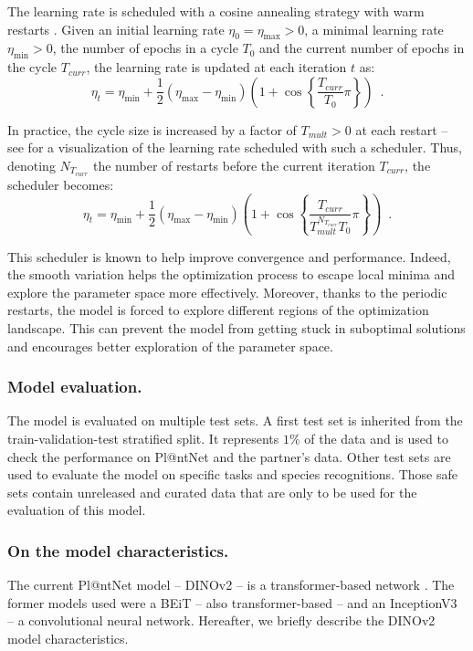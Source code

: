 The learning rate is scheduled with a cosine annealing strategy with warm restarts \citep{loshchilov2016sgdr}.
Given an initial learning rate $\eta_0=\eta_{\max}>0$, a minimal learning rate $\eta_{\min}>0$, the number of epochs in a cycle $T_0$ and the current number of epochs in  the cycle $T_{curr}$, the learning rate is updated at each iteration $t$ as:
\[
\eta_t = \eta_{\min} + \frac{1}{2}(\eta_{\max} - \eta_{\min})\left(   1+ \cos\left\{ \frac{T_{curr}}{T_0}\pi \right\}\right)    \enspace.
\]

In practice, the cycle size is increased by a factor of $T_{mult}>0$ at each restart -- see  for a visualization of the learning rate scheduled with such a scheduler. Thus, denoting $N_{T_{curr}}$ the number of restarts before the current iteration $T_{curr}$, the scheduler becomes:
\[
\eta_t = \eta_{\min} + \frac{1}{2}(\eta_{\max} - \eta_{\min})\left(   1+ \cos\left\{ \frac{T_{curr}}{T_{mult}^{N_{T_{curr}}}T_0}\pi \right\}\right)    \enspace.
\]

This scheduler is known to help improve convergence and performance.
Indeed, the smooth variation helps the optimization process to escape local minima and explore the parameter space more effectively.
Moreover, thanks to the periodic restarts, the model is forced to explore different regions of the optimization landscape. This can prevent the model from getting stuck in suboptimal solutions and encourages better exploration of the parameter space.

\subsubsection{Model evaluation.}

The model is evaluated on multiple test sets.
A first test set is inherited from the train-validation-test stratified split.
It represents $1\%$ of the data and is used to check the performance on Pl@ntNet and the partner's data.
Other test sets are used to evaluate the model on specific tasks and species recognitions.
Those safe sets contain unreleased and curated data that are only to be used for the evaluation of this model.

\subsubsection{On the model characteristics.}

The current Pl@ntNet model -- DINOv2 \citep{oquab2024dinov2} -- is a transformer-based network \citep{dosovitskiy2020image}.
The former models used were a BEiT \citep{bao2021beit} -- also transformer-based -- and an InceptionV3 \citep{szegedy2015rethinking} -- a convolutional neural network.
Hereafter, we briefly describe the DINOv2 model characteristics.

